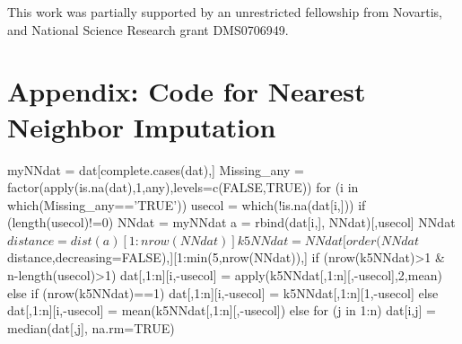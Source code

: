 \documentclass[article]{jss}
\begin{document}
This work was partially supported by an unrestricted fellowship from Novartis, and National Science Research grant DMS0706949.

%




\section*{Appendix: Code for Nearest Neighbor Imputation}

\begin{Code}
myNNdat = dat[complete.cases(dat),]
Missing_any = factor(apply(is.na(dat),1,any),levels=c(FALSE,TRUE))
for (i in which(Missing_any=='TRUE')){
    usecol = which(!is.na(dat[i,]))
    if (length(usecol)!=0){
        NNdat = myNNdat
        a = rbind(dat[i,], NNdat)[,usecol]
        NNdat$distance = dist(a)[1:nrow(NNdat)]
        k5NNdat = NNdat[order(NNdat$distance,decreasing=FALSE),][1:min(5,nrow(NNdat)),]
        if (nrow(k5NNdat)>1 & n-length(usecol)>1) {
            dat[,1:n][i,-usecol] = apply(k5NNdat[,1:n][,-usecol],2,mean)
        } else {
            if (nrow(k5NNdat)==1) {
                dat[,1:n][i,-usecol] = k5NNdat[,1:n][1,-usecol]
            } else {
                dat[,1:n][i,-usecol] = mean(k5NNdat[,1:n][,-usecol])
            }
        }
    } else {
        for (j in 1:n) {
            dat[i,j] = median(dat[,j], na.rm=TRUE)
        }
    }
}
\end{Code}
\end{document}
